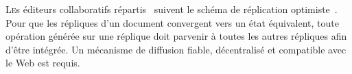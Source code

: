 


\lettrine{L}es éditeurs collaboratifs répartis~\cite{ellis1991groupware} suivent
le schéma de réplication optimiste~\cite{demers1987epidemic,
  johnson1975maintenance, ladin1992providing, saito2005optimistic}. Pour que les
répliques d'un document convergent vers un état équivalent, toute opération
générée sur une réplique doit parvenir à toutes les autres répliques afin d'être
intégrée. Un mécanisme de diffusion fiable, décentralisé et compatible avec le
Web est requis.


